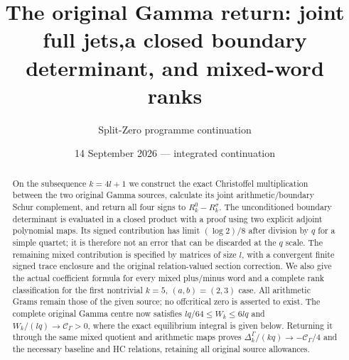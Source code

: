 \documentclass[11pt,a4paper]{article}
\title{The original Gamma return: joint full jets,\newline a closed boundary determinant, and mixed-word ranks}
\author{Split-Zero programme continuation}
\date{14 September 2026 --- integrated continuation}
\begin{document}
\maketitle
\begin{abstract}
On the subsequence $k=4l+1$ we construct the exact Christoffel multiplication between the two original Gamma sources, calculate its joint arithmetic/boundary Schur complement, and return all four signs to $R_k^0-R_k^\sigma$. The unconditioned boundary determinant is evaluated in a closed product with a proof using two explicit adjoint polynomial maps. Its signed contribution has limit $(\log 2)/8$ after division by $q$ for a simple quartet; it is therefore not an error that can be discarded at the $q$ scale. The remaining mixed contribution is specified by matrices of size $l$, with a convergent finite signed trace enclosure and the original relation-valued section correction. We also give the actual coefficient formula for every mixed plus/minus word and a complete rank classification for the first nontrivial $k=5$, $(a,b)=(2,3)$ case. All arithmetic Grams remain those of the given source; no offcritical zero is asserted to exist.
The complete original Gamma centre now satisfies
$lq/64\leq W_k\leq6lq$ and $W_k/(lq)\to\mathcal C_\Gamma>0$,
where the exact equilibrium integral is given below. Returning it
through the same mixed quotient and arithmetic maps proves
$\Delta_k^\Gamma/(kq)\to-\mathcal C_\Gamma/4$ and the necessary
baseline and HC relations, retaining all original source allowances.
\end{abstract}
\end{document}
